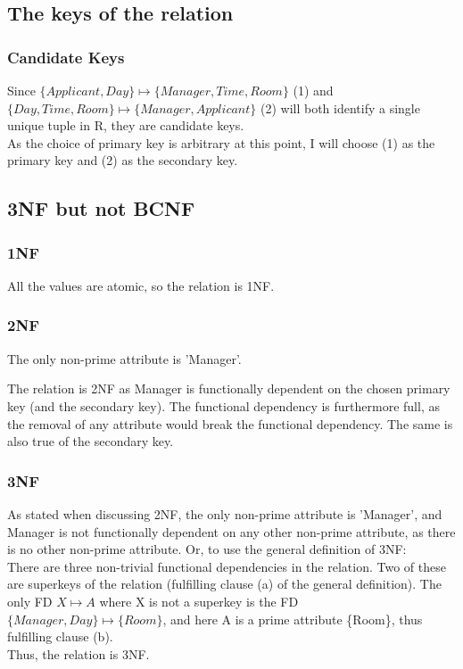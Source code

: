 \documentclass[12pt]{article}
\begin{document}
\subsection {The keys of the relation}\label{subsec:the-keys-of-the-relation}

\subsubsection {Candidate Keys}

Since \(\{Applicant, Day\} \mapsto \{Manager, Time, Room\}\) (1) and \(\{Day, Time, Room\} \mapsto \{Manager, Applicant\}\) (2) will both identify a single unique tuple in R, they are candidate keys. \\
As the choice of primary key is arbitrary at this point, I will choose (1) as the primary key and (2) as the secondary key.

\subsection {3NF but not BCNF}\label{subsec:3nf-but-not-bcnf}
\subsubsection {1NF}

All the values are atomic, so the relation is 1NF\@.

\subsubsection {2NF}

The only non-prime attribute is 'Manager'.

The relation is 2NF as Manager is functionally dependent on the chosen primary key (and the secondary key).
The functional dependency is furthermore full, as the removal of any attribute would break the functional dependency.
The same is also true of the secondary key.

\subsubsection {3NF}

As stated when discussing 2NF, the only non-prime attribute is 'Manager', and Manager is not functionally dependent on any other non-prime attribute, as there is no other non-prime attribute.
Or, to use the general definition of 3NF:\\
There are three non-trivial functional dependencies in the relation.
Two of these are superkeys of the relation (fulfilling clause (a) of the general definition).
The only FD \(X \mapsto A\) where X is not a superkey is the FD \(\{Manager, Day\} \mapsto \{Room\}\), and here A is a prime attribute \{Room\}, thus fulfilling clause (b).
\\Thus, the relation is 3NF\@.
\end{document}
